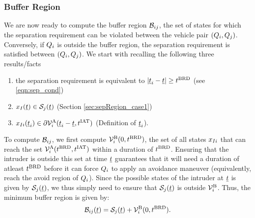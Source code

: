 \subsubsection{Buffer Region} \label{sec:buffRegion_case1}
We are now ready to compute the buffer region $\mathcal{B}_{ij}$, the set of states for which the separation requirement can be violated between the vehicle pair $(Q_i, Q_j)$. Conversely, if $Q_i$ is outside the buffer region, the separation requirement is satisfied between $(Q_i, Q_j)$. We start with recalling the following three results/facts
\begin{enumerate}
\item the separation requirement is equivalent to $|\underline{t}_i - \underline{t}| \geq t^\text{BRD}$ (see \ref{eqn:sep_cond})
\item $x_{I}(\underline{t}) \in \mathcal{S}_j(\underline{t})$ (Section \ref{sec:sepRegion_case1})
\item $x_{I i}(\underline{t}_i) \in \partial \mathcal{V}^{\text{A}}_{i}(\underline{t}_i-\underline{t}, t^\text{IAT})$ (Definition of $\underline{t}_i$).
\end{enumerate}

To compute $\mathcal{B}_{ij}$, we first compute $\mathcal{V}^{\text{B}}_{i}(0, t^\text{BRD})$, the set of all states $x_{I i}$ that can reach the set $\mathcal{V}^{\text{A}}_{i}(t^\text{BRD}, t^\text{IAT})$ within a duration of $t^\text{BRD}$. Ensuring that the intruder is outside this set at time $\underline{t}$ guarantees that it will need a duration of atleast $t^\text{BRD}$ before it can force $Q_i$ to apply an avoidance maneuver (equivalently, reach the avoid region of $Q_i$). Since the possible states of the intruder at $\underline{t}$ is given by $\mathcal{S}_j(\underline{t})$, we thus simply need to ensure that $\mathcal{S}_j(\underline{t})$ is outside $\mathcal{V}^{\text{B}}_{i}$. Thus, the minimum buffer region is given by:
\begin{equation} \label{eqn:buffRegion_case1}
\buff_{ij}(\tsa) = \sep_j(\tsa) + \brs^{\text{B}}_{i}(0, \brd).
\end{equation} 


